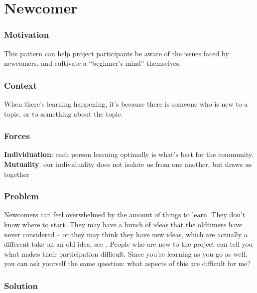 

\section{Newcomer}\label{sec:Newcomer}

\subsubsection*{Motivation} This pattern can help project participants be aware of the issues faced by newcomers, and cultivate a ``beginner's mind'' themselves.

\subsubsection*{Context}
When there's learning happening, it's because there is someone who is new to a topic, or to something about the topic.

\subsubsection*{Forces}
\parbox[t]{.85\textwidth}{
\textbf{Individuation}: each person learning optimally is what's best for the community.\\
\textbf{Mutuality}: our individuality does not isolate us from one another, but draws us together
}

\subsubsection*{Problem} Newcomers can feel overwhelmed by the amount of things to learn.  They
don't know where to start.  They may have a bunch of ideas that the
oldtimers have never considered -- or they may think they have new
ideas, which are actually a different take on an old idea; see
. People who are new to the project can tell you what makes their participation difficult.  Since you're learning as you go as well, you can ask yourself the same question: what aspects of this are difficult for me?  

\subsubsection*{Solution}

